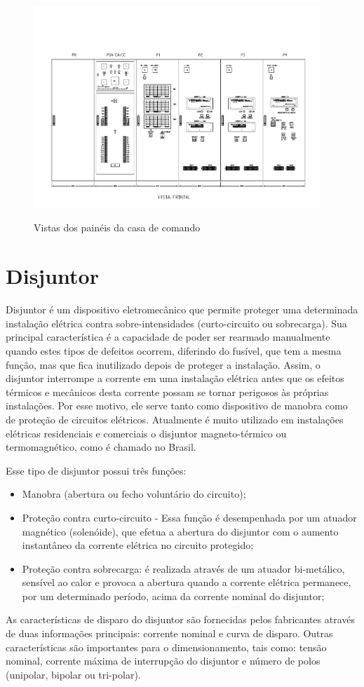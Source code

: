 \documentclass[a5paper,english,spanish,brazil]{ufsc-thesis}
\begin{document}
\begin{figure}[htb]
  \caption{Vistas dos painéis da casa de comando}
  \centering
  \includegraphics[width=10.8cm]{paineis.pdf}
  \label{fig:paineis}
\end{figure}

\section{Disjuntor}
Disjuntor é um dispositivo eletromecânico que permite proteger uma determinada instalação elétrica contra sobre-intensidades (curto-circuito ou sobrecarga). Sua principal característica é a capacidade de poder ser rearmado manualmente quando estes tipos de defeitos ocorrem, diferindo do fusível, que tem a mesma função, mas que fica inutilizado depois de proteger a instalação. Assim, o disjuntor interrompe a corrente em uma instalação elétrica antes que os efeitos térmicos e mecânicos desta corrente possam se tornar perigosos às próprias instalações. Por esse motivo, ele serve tanto como dispositivo de manobra como de proteção de circuitos elétricos. Atualmente é muito utilizado em instalações elétricas residenciais e comerciais o disjuntor magneto-térmico ou termomagnético, como é chamado no Brasil.\par
Esse tipo de disjuntor possui três funções:
\begin{itemize}
\item Manobra (abertura ou fecho voluntário do circuito);
\item Proteção contra curto-circuito - Essa função é desempenhada por um atuador magnético (solenóide), que efetua a abertura do disjuntor com o aumento instantâneo da corrente elétrica no circuito protegido;
\item Proteção contra sobrecarga: é realizada através de um atuador bi-metálico, sensível ao calor e provoca a abertura quando a corrente elétrica permanece, por um determinado período, acima da corrente nominal do disjuntor; 
\end{itemize}\par
As características de disparo do disjuntor são fornecidas pelos fabricantes através de duas informações principais: corrente nominal e curva de disparo. Outras características são importantes para o dimensionamento, tais como: tensão nominal, corrente máxima de interrupção do disjuntor e número de polos (unipolar, bipolar ou tri-polar).\par
\end{document}
